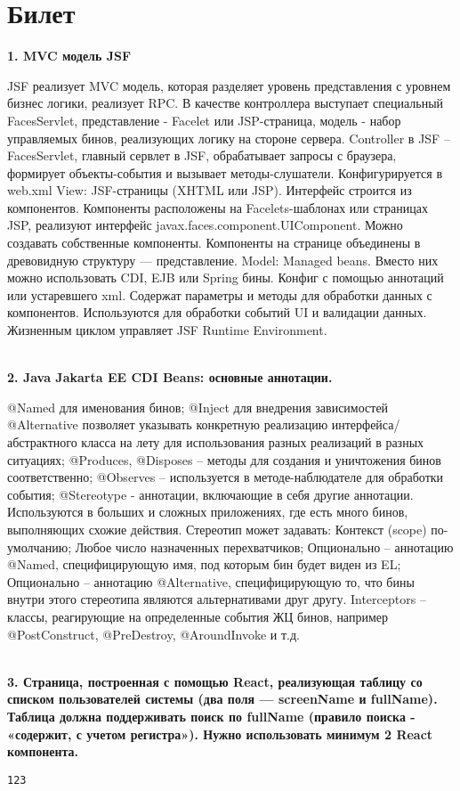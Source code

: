 \documentclass{article}
\newcommand{\bil}[5]{%
        \section{Билет}
        \textbf{1. #1}

        #4
        \\
        \textbf{2. #2}
        
        #5
        \\
        \textbf{3. #3}
}
\begin{document}
\bil{MVC модель JSF}
{Java Jakarta EE CDI Beans: основные аннотации.}
{Страница, построенная с помощью React, реализующая таблицу со списком пользователей системы (два поля — screenName и fullName). Таблица должна поддерживать поиск по fullName (правило поиска - «содержит, с учетом регистра»). Нужно использовать минимум 2 React компонента.}{
    JSF реализует MVC модель, которая разделяет уровень представления с уровнем бизнес логики, реализует RPC. В качестве контроллера выступает специальный FacesServlet, представление - Facelet или JSP-страница, модель - набор управляемых бинов, реализующих логику на стороне сервера. 
Controller в JSF – FacesServlet, главный сервлет в JSF, обрабатывает запросы с браузера, формирует объекты-события и вызывает методы-слушатели. Конфигурируется в web.xml
View: JSF-страницы (XHTML или JSP).
Интерфейс строится из компонентов.
Компоненты расположены на Facelets-шаблонах или страницах JSP, реализуют интерфейс javax.faces.component.UIComponent.
Можно создавать собственные компоненты.
Компоненты на странице объединены в древовидную структуру — представление.
Model: Managed beans. Вместо них можно использовать CDI, EJB или Spring бины.
Конфиг с помощью аннотаций или устаревшего xml.
Содержат параметры и методы для обработки данных с компонентов.
Используются для обработки событий UI и валидации данных.
Жизненным циклом управляет JSF Runtime Environment.
}{
    @Named для именования бинов; @Inject для внедрения зависимостей
@Alternative позволяет указывать конкретную реализацию интерфейса/абстрактного класса на лету для использования разных реализаций в разных ситуациях;
@Produces, @Disposes – методы для создания и уничтожения бинов соответственно;
@Observes – используется в методе-наблюдателе для обработки события;
@Stereotype - аннотации, включающие в себя другие аннотации. Используются в больших и сложных приложениях, где есть много бинов, выполняющих схожие действия.
Стереотип может задавать: Контекст (scope) по-умолчанию;
Любое число назначенных перехватчиков;
Опционально – аннотацию @Named, специфицирующую имя, под которым бин будет виден из EL;
Опционально – аннотацию @Alternative, специфицирующую то, что бины внутри этого стереотипа являются альтернативами друг другу.
Interceptors – классы, реагирующие на определенные события ЖЦ бинов, например @PostConstruct, @PreDestroy, @AroundInvoke и т.д.
}
\begin{lstlisting}[frame=single, basicstyle=\ttfamily, breaklines=true, breakatwhitespace=true, postbreak=\mbox{\textcolor{red}{$\hookrightarrow$}\space}]
123
\end{lstlisting}
\end{document}
